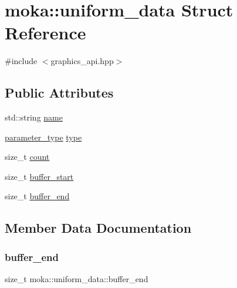 \hypertarget{structmoka_1_1uniform__data}{}\section{moka\+::uniform\+\_\+data Struct Reference}
\label{structmoka_1_1uniform__data}


{\ttfamily \#include $<$graphics\+\_\+api.\+hpp$>$}

\subsection*{Public Attributes}
\begin{DoxyCompactItemize}
\item 
std\+::string \mbox{\hyperlink{structmoka_1_1uniform__data_a7cd79fb927e43cdf08783f2c55467dae}{name}}
\item 
\mbox{\hyperlink{namespacemoka_aed2224bc0e5b79e57a8975ded94ee1aa}{parameter\+\_\+type}} \mbox{\hyperlink{structmoka_1_1uniform__data_ac0fbbec5500fdf92cc84e56cbcff9d6d}{type}}
\item 
size\+\_\+t \mbox{\hyperlink{structmoka_1_1uniform__data_af3016a77d03f6ee4263b54e17cfb6dd0}{count}}
\item 
size\+\_\+t \mbox{\hyperlink{structmoka_1_1uniform__data_a86fa732c8b76588a413ec1860ca22be7}{buffer\+\_\+start}}
\item 
size\+\_\+t \mbox{\hyperlink{structmoka_1_1uniform__data_afc7f293c672c9e4bae1f19756ccc9c07}{buffer\+\_\+end}}
\end{DoxyCompactItemize}


\subsection{Member Data Documentation}
\mbox{\label{structmoka_1_1uniform__data_afc7f293c672c9e4bae1f19756ccc9c07}} 
\subsubsection{\texorpdfstring{buffer\_end}{buffer\_end}}
{\footnotesize\ttfamily size\+\_\+t moka\+::uniform\+\_\+data\+::buffer\+\_\+end}

\mbox{\label{structmoka_1_1uniform__data_a86fa732c8b76588a413ec1860ca22be7}} 
